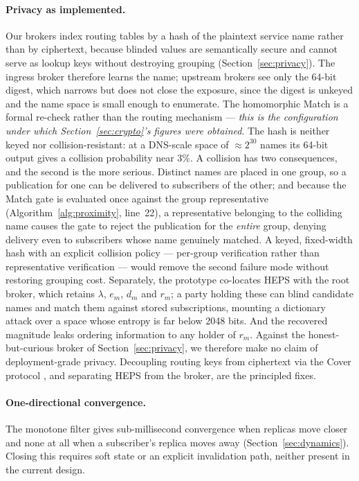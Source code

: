 \documentclass[10pt]{article}
\begin{document}
\paragraph{Privacy as implemented.} Our brokers index routing tables by a hash of the plaintext service name rather than by ciphertext, because blinded values are semantically secure and cannot serve as lookup keys without destroying grouping (Section~\ref{sec:privacy}). The ingress broker therefore learns the name; upstream brokers see only the 64-bit digest, which narrows but does not close the exposure, since the digest is unkeyed and the name space is small enough to enumerate. The homomorphic Match is a formal re-check rather than the routing mechanism --- \emph{this is the configuration under which Section~\ref{sec:crypto}'s figures were obtained}. The hash is neither keyed nor collision-resistant: at a DNS-scale space of $\approx 2^{30}$ names its 64-bit output gives a collision probability near 3\%. A collision has two consequences, and the second is the more serious. Distinct names are placed in one group, so a publication for one can be delivered to subscribers of the other; and because the Match gate is evaluated once against the group representative (Algorithm~\ref{alg:proximity}, line~22), a representative belonging to the colliding name causes the gate to reject the publication for the \emph{entire} group, denying delivery even to subscribers whose name genuinely matched. A keyed, fixed-width hash with an explicit collision policy --- per-group verification rather than representative verification --- would remove the second failure mode without restoring grouping cost. Separately, the prototype co-locates HEPS with the root broker, which retains $\lambda$, $e_m$, $d_m$ and $r_m$; a party holding these can blind candidate names and match them against stored subscriptions, mounting a dictionary attack over a space whose entropy is far below 2048 bits. And the recovered magnitude leaks ordering information to any holder of $r_m$. Against the honest-but-curious broker of Section~\ref{sec:privacy}, we therefore make no claim of deployment-grade privacy. Decoupling routing keys from ciphertext via the Cover protocol \citep{nabeel2012efficient}, and separating HEPS from the broker, are the principled fixes.

\paragraph{One-directional convergence.} The monotone filter gives sub-millisecond convergence when replicas move closer and none at all when a subscriber's replica moves away (Section~\ref{sec:dynamics}). Closing this requires soft state or an explicit invalidation path, neither present in the current design.
\end{document}
